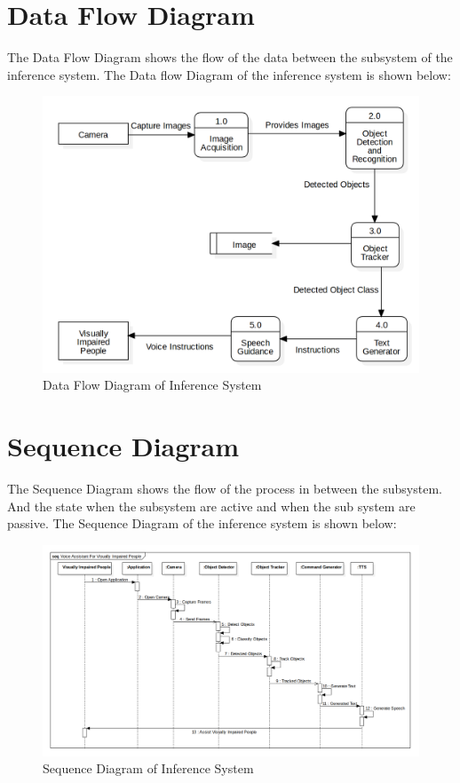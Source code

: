         \section{Data Flow Diagram}
    The Data Flow Diagram shows the flow of the data between the subsystem of the inference system. The Data flow Diagram of the inference system is shown below:
            \begin{figure}[h]
            \centering
                \includegraphics[width=1.0\textwidth]{img/Final_DFD.png}
                \caption{Data Flow Diagram of Inference System}    
            \end{figure}
    \pagebreak
    \section{Sequence Diagram}
    The Sequence Diagram shows the flow of the process in between the subsystem. And the state when the subsystem are active and when the sub system are passive. The Sequence Diagram of the inference system is shown below:
            \begin{figure}[h]
            \centering
                \includegraphics[width=1.0\textwidth]{img/Final_Sequence.png}
                \caption{Sequence Diagram of Inference System}    
            \end{figure}
    \pagebreak

